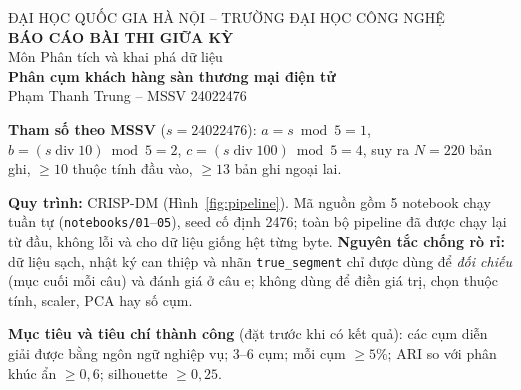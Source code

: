 \documentclass[12pt,a4paper]{article}
\newcommand{\code}[1]{\texttt{#1}}
\begin{document}
\begin{center}
{\small ĐẠI HỌC QUỐC GIA HÀ NỘI -- TRƯỜNG ĐẠI HỌC CÔNG NGHỆ}\\[4pt]
{\Large\bfseries BÁO CÁO BÀI THI GIỮA KỲ}\\[2pt]
{\large Môn Phân tích và khai phá dữ liệu}\\[6pt]
{\bfseries Phân cụm khách hàng sàn thương mại điện tử}\\[6pt]
Phạm Thanh Trung -- MSSV 24022476
\end{center}

\noindent\textbf{Tham số theo MSSV} ($s = 24022476$): $a = s \bmod 5 = 1$, $b = (s \operatorname{div} 10) \bmod 5 = 2$, $c = (s \operatorname{div} 100) \bmod 5 = 4$, suy ra $N = 220$ bản ghi, $\ge 10$ thuộc tính đầu vào, $\ge 13$ bản ghi ngoại lai.

\noindent\textbf{Quy trình:} CRISP-DM (Hình~\ref{fig:pipeline}). Mã nguồn gồm 5 notebook chạy tuần tự (\code{notebooks/01}--\code{05}), seed cố định 2476; toàn bộ pipeline đã được chạy lại từ đầu, không lỗi và cho dữ liệu giống hệt từng byte. \textbf{Nguyên tắc chống rò rỉ:} dữ liệu sạch, nhật ký can thiệp và nhãn \code{true\_segment} chỉ được dùng để \emph{đối chiếu} (mục cuối mỗi câu) và đánh giá ở câu e; không dùng để điền giá trị, chọn thuộc tính, scaler, PCA hay số cụm.

\noindent\textbf{Mục tiêu và tiêu chí thành công} (đặt trước khi có kết quả): các cụm diễn giải được bằng ngôn ngữ nghiệp vụ; 3--6 cụm; mỗi cụm $\ge 5\%$; ARI so với phân khúc ẩn $\ge 0{,}6$; silhouette $\ge 0{,}25$.
\end{document}
